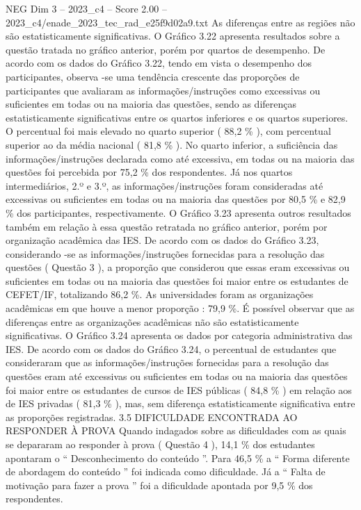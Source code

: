 \begin{textsample}{NEG Dim 3 – 2023\_c4 – Score 2.00 – 2023\_c4/enade\_2023\_tec\_rad\_e25f9d02a9.txt}
As diferenças entre as regiões não são estatisticamente significativas.
O Gráfico 3.22 apresenta resultados sobre a questão tratada no gráfico anterior, porém por quartos de desempenho.
De acordo com os dados do Gráfico 3.22, tendo em vista o desempenho dos participantes, observa -se uma tendência crescente das proporções de participantes que avaliaram as informações/instruções como excessivas ou suficientes em todas ou na maioria das questões, sendo as diferenças estatisticamente significativas entre os quartos inferiores e os quartos superiores.
O percentual foi mais elevado no quarto superior ( 88,2 \% ), com percentual superior ao da média nacional ( 81,8 \% ).
No quarto inferior, a suficiência das informações/instruções declarada como até excessiva, em todas ou na maioria das questões foi percebida por 75,2 \% dos respondentes.
Já nos quartos intermediários, 2.º e 3.º, as informações/instruções foram consideradas até excessivas ou suficientes em todas ou na maioria das questões por 80,5 \% e 82,9 \% dos participantes, respectivamente.
O Gráfico 3.23 apresenta outros resultados também em relação à essa questão retratada no gráfico anterior, porém por organização acadêmica das IES.
De acordo com os dados do Gráfico 3.23, considerando -se as informações/instruções fornecidas para a resolução das questões ( Questão 3 ), a proporção que considerou que essas eram excessivas ou suficientes em todas ou na maioria das questões foi maior entre os estudantes de CEFET/IF, totalizando 86,2 \%.
As universidades foram as organizações acadêmicas em que houve a menor proporção : 79,9 \%.
É possível observar que as diferenças entre as organizações acadêmicas não são estatisticamente significativas.
O Gráfico 3.24 apresenta os dados por categoria administrativa das IES.
De acordo com os dados do Gráfico 3.24, o percentual de estudantes que consideraram que as informações/instruções fornecidas para a resolução das questões eram até excessivas ou suficientes em todas ou na maioria das questões foi maior entre os estudantes de cursos de IES públicas ( 84,8 \% ) em relação aos de IES privadas ( 81,3 \% ), mas, sem diferença estatisticamente significativa entre as proporções registradas. 3.5 DIFICULDADE ENCONTRADA AO RESPONDER À PROVA Quando indagados sobre as dificuldades com as quais se depararam ao responder à prova ( Questão 4 ), 14,1 \% dos estudantes apontaram o “ Desconhecimento do conteúdo ”.
Para 46,5 \% a “ Forma diferente de abordagem do conteúdo ” foi indicada como dificuldade.
Já a “ Falta de motivação para fazer a prova ” foi a dificuldade apontada por 9,5 \% dos respondentes.

\end{textsample}
